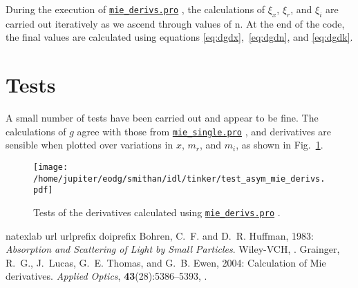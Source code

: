 \documentclass[a4paper,10pt]{article}
\def \asym { {g} }
\def \mied { \href{/home/crun/eodg/idl/mie/mie_derivs.pro}{\tt mie\_derivs.pro} }
\def \mies { \href{/home/crun/eodg/idl/mie/mie_single.pro}{\tt mie\_single.pro} }
\begin{document}
During the execution of \mied, the calculations of $\xi_x$, $\xi_r$, and $\xi_i$ are carried out iteratively as we ascend through values of n.
At the end of the code, the final values are calculated using equations \ref{eq:dgdx},~\ref{eq:dgdn}, and \ref{eq:dgdk}.

\section{Tests}

A small number of tests have been carried out and appear to be fine. The calculations of $\asym$ agree with those from \mies, and derivatives are sensible when plotted over variations in $x$, $m_r$, and $m_i$, as shown in Fig.~\ref{fig:test}.

\begin{figure}
 \texttt{[image: /home/jupiter/eodg/smithan/idl/tinker/test\_asym\_mie\_derivs.pdf]}
 \caption{Tests of the derivatives calculated using \mied.}
 \label{fig:test}
\end{figure}




\begin{thebibliography}{2}
\expandafter\ifx\csname natexlab\endcsname\relax\def\natexlab#1{#1}\fi
\expandafter\ifx\csname url\endcsname\relax
  \def\url#1{{\tt #1}}\fi
\expandafter\ifx\csname urlprefix\endcsname\relax\def\urlprefix{URL }\fi
\expandafter\ifx\csname doiprefix\endcsname\relax\def\doiprefix{doi:}\fi
{}
Bohren, C.~F. and D.~R. Huffman, 1983: {\it Absorption and Scattering of Light
  by Small Particles\/}. Wiley-{VCH}, .
Grainger, R.~G., J.~Lucas, G.~E. Thomas, and G.~B. Ewen, 2004: Calculation of
  {M}ie derivatives. {\it Applied Optics\/}, {\bf 43}(28):5386--5393,
  .
\end{thebibliography}
\end{document}
